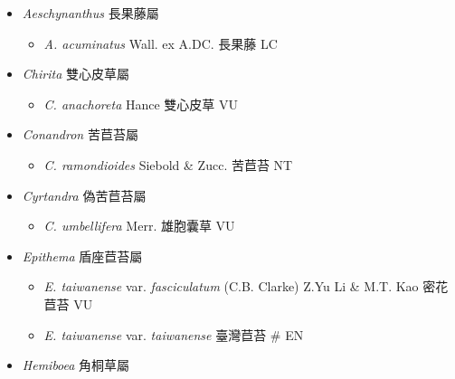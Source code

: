 
  \begin{itemize}
 \item[] \textit{Aeschynanthus} 長果藤屬
                                
  \begin{itemize}
        \item[] \textit{A. acuminatus} Wall. ex A.DC.  長果藤   LC
  \end{itemize}
 \item[] \textit{Chirita} 雙心皮草屬
                                
  \begin{itemize}
        \item[] \textit{C. anachoreta} Hance  雙心皮草   VU
  \end{itemize}
 \item[] \textit{Conandron} 苦苣苔屬
                                
  \begin{itemize}
        \item[] \textit{C. ramondioides} Siebold \& Zucc.  苦苣苔   NT
  \end{itemize}
 \item[] \textit{Cyrtandra} 偽苦苣苔屬
                                
  \begin{itemize}
        \item[] \textit{C. umbellifera} Merr.  雄胞囊草   VU
  \end{itemize}
 \item[] \textit{Epithema} 盾座苣苔屬
                                
  \begin{itemize}
        \item[] \textit{E. taiwanense} var. \textit{fasciculatum} (C.B. Clarke) Z.Yu Li \& M.T. Kao  密花苣苔   VU
        \item[] \textit{E. taiwanense} var. \textit{taiwanense}   臺灣苣苔  \# EN
  \end{itemize}
 \item[] \textit{Hemiboea} 角桐草屬
                                

\end{itemize}
